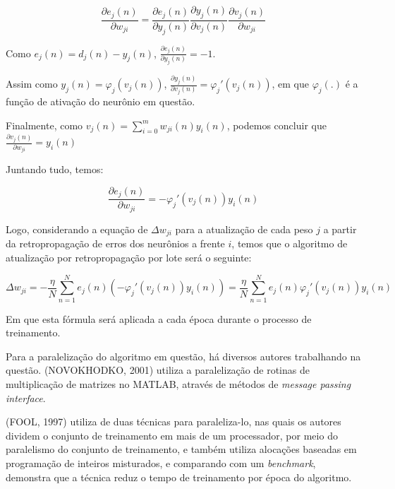 \documentclass[a4paper, 12pt]{article}
\begin{document}
\begin{equation}
    \frac{\partial e_j(n)}{\partial w_{ji}} = \frac{\partial e_j(n)}{\partial y_j(n)}
                                              \frac{\partial y_j(n)}{\partial v_j(n)}
                                              \frac{\partial v_j(n)}{\partial w_{ji}}
\end{equation}

Como $e_j(n) = d_j(n) - y_j(n)$, $\frac{\partial e_j(n)}{\partial y_j(n)} = -1$.

Assim como $y_j(n) = \varphi_j (v_j(n))$, $\frac{\partial y_j(n)}{\partial v_j(n)}=\varphi_j' (v_j(n))$, em que $\varphi_j(.)$ é a função de ativação do neurônio em questão.

Finalmente, como $v_j(n) = \sum\limits_{i=0}^m w_{ji}(n)y_i(n)$, podemos concluir que $\frac{\partial v_j(n)}{\partial w_{ji}} = y_i(n)$

Juntando tudo, temos: 

\begin{equation}
   \frac{\partial e_j(n)}{\partial w_{ji}} = -
                                             \varphi_j' (v_j(n))
                                             y_i(n)
\end{equation}

Logo, considerando a equação de $\Delta w_{ji}$ para a atualização de cada peso $j$ a partir da retropropagação de erros dos neurônios a frente $i$, temos que o algoritmo de atualização por retropropagação por lote será o seguinte:

\begin{equation}
    \Delta w_{ji} = -\frac{\eta}{N} \sum\limits_{n=1}^{N} e_j(n)(-\varphi_j' (v_j(n))y_i(n))
                  = \frac{\eta}{N} \sum\limits_{n=1}^{N} e_j(n)\varphi_j' (v_j(n))y_i(n)
\end{equation}

Em que esta fórmula será aplicada a cada época durante o processo de treinamento.

Para a paralelização do algoritmo em questão, há diversos autores trabalhando na questão. (NOVOKHODKO, 2001)\cite{novokhodko2001parallel} utiliza a paralelização de rotinas de multiplicação de matrizes no MATLAB, através de métodos de \textit{message passing interface}. 

(FOOL, 1997)\cite{foo1997parallel} utiliza de duas técnicas para paraleliza-lo, nas quais os autores dividem o conjunto de treinamento em mais de um processador, por meio do paralelismo do conjunto de treinamento, e também utiliza alocações baseadas em programação de inteiros misturados, e comparando com um \textit{benchmark}, demonstra que a técnica reduz o tempo de treinamento por época do algoritmo.
\end{document}
